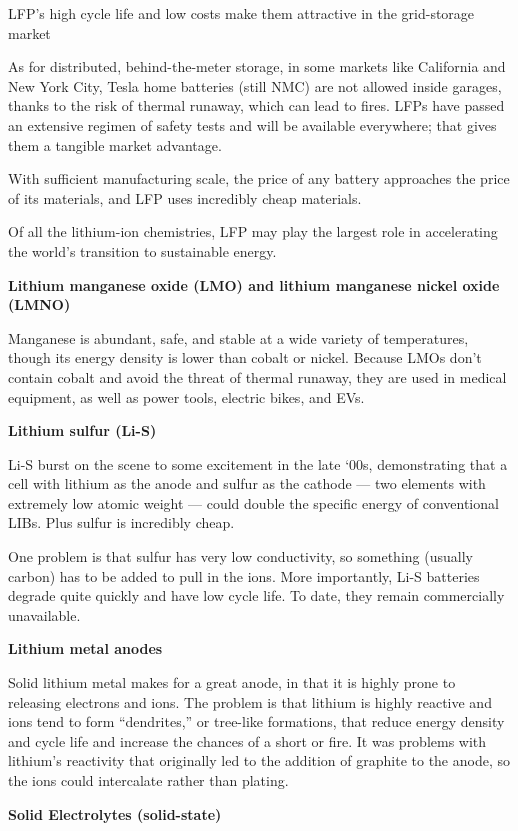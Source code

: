 \documentclass[
]{book}
\begin{document}
LFP's high cycle life and low costs make them attractive in the grid-storage market

As for distributed, behind-the-meter storage, in some markets like California and New York City, Tesla home batteries (still NMC) are not allowed inside garages, thanks to the risk of thermal runaway, which can lead to fires. LFPs have passed an extensive regimen of safety tests and will be available everywhere; that gives them a tangible market advantage.

With sufficient manufacturing scale, the price of any battery approaches the price of its materials, and LFP uses incredibly cheap materials.

Of all the lithium-ion chemistries, LFP may play the largest role in accelerating the world's transition to sustainable energy.

\textbf{Lithium manganese oxide (LMO) and lithium manganese nickel oxide (LMNO)}

Manganese is abundant, safe, and stable at a wide variety of temperatures, though its energy density is lower than cobalt or nickel. Because LMOs don't contain cobalt and avoid the threat of thermal runaway, they are used in medical equipment, as well as power tools, electric bikes, and EVs.

\textbf{Lithium sulfur (Li-S)}

Li-S burst on the scene to some excitement in the late `00s, demonstrating that a cell with lithium as the anode and sulfur as the cathode --- two elements with extremely low atomic weight --- could double the specific energy of conventional LIBs. Plus sulfur is incredibly cheap.

One problem is that sulfur has very low conductivity, so something (usually carbon) has to be added to pull in the ions. More importantly, Li-S batteries degrade quite quickly and have low cycle life. To date, they remain commercially unavailable.

\textbf{Lithium metal anodes}

Solid lithium metal makes for a great anode, in that it is highly prone to releasing electrons and ions.
The problem is that lithium is highly reactive and ions tend to form ``dendrites,'' or tree-like formations, that reduce energy density and cycle life and increase the chances of a short or fire. It was problems with lithium's reactivity that originally led to the addition of graphite to the anode, so the ions could intercalate rather than plating.

\textbf{Solid Electrolytes (solid-state)}
\end{document}
